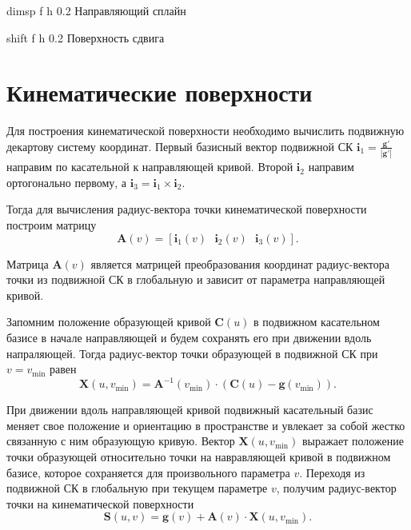 \documentclass{bmstu}
\begin{document}
{dimsp} %
{f} %
{h} %
{0.2\textwidth} %
{Направляющий сплайн} %

{shift} %
{f} %
{h} %
{0.2\textwidth} %
{Поверхность сдвига} %

\section{Кинематические поверхности}
Для построения кинематической поверхности необходимо вычислить подвижную декартову систему координат.
Первый базисный вектор подвижной СК $\mathbf{i}_1= \frac{\mathbf{g}'}{|\mathbf{g}'|}$ направим по касательной к направляющей кривой. Второй $\mathbf{i}_2$ направим ортогонально первому, а $\mathbf{i}_3 = \mathbf{i}_1\times\mathbf{i}_2$.

Тогда для вычисления радиус-вектора точки кинематической поверхности построим матрицу
\begin{equation}
    \mathbf{A}(v) = [\mathbf{i}_1(v)~~~\mathbf{i}_2(v)~~~\mathbf{i}_3(v)].
\end{equation}

Матрица $\mathbf{A}(v)$ является матрицей преобразования координат радиус-вектора точки из подвижной СК в глобальную и зависит от параметра направляющей кривой.

Запомним положение образующей кривой $\mathbf{C}(u)$ в подвижном касательном базисе в начале направляющей и будем сохранять его при движении вдоль напраляющей. Тогда радиус-вектор точки образующей в подвижной СК при $v=v_{\min}$ равен
\begin{equation}
    \mathbf{X}(u, v_{\min}) = \mathbf{A}^{-1}(v_{\min})\cdot(\mathbf{C}(u)-\mathbf{g}(v_{\min})).
\end{equation}

При движении вдоль направляющей кривой подвижный касательный базис меняет свое положение и ориентацию в пространстве и увлекает за собой жестко связанную с ним образующую кривую. Вектор $\mathbf{X}(u, v_{\min})$ выражает положение точки образующей относительно точки на навравляющей кривой в подвижном базисе, которое сохраняется для произвольного параметра $v$. Переходя из подвижной СК в глобальную при текущем параметре $v$, получим радиус-вектор точки на кинематической поверхности
\begin{equation}
    \mathbf{S}(u,v) = \mathbf{g}(v) + \mathbf{A}(v)\cdot\mathbf{X}(u, v_{\min}).
\end{equation} 
\end{document}
